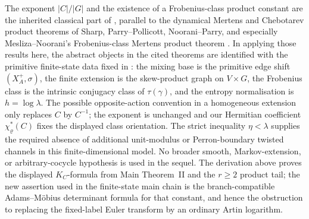 \documentclass[11pt,a4paper]{amsart}
\theoremstyle{plain}
\theoremstyle{definition}
\theoremstyle{remark}
\begin{document}
The exponent \(|C|/|G|\) and the existence of a Frobenius-class product
constant are the inherited classical part of ,
parallel to the dynamical Mertens and Chebotarev product theorems of Sharp,
Parry--Pollicott, Noorani--Parry, and especially Mesliza--Noorani's
Frobenius-class Mertens product theorem
\cite{Sharp1991Mertens,ParryPollicott1986Chebotarev,NooraniParry1992ChebotarevShifts,MeslizaNoorani1999FrobeniusMertens}.
In applying those results here, the abstract objects in the cited theorems are
identified with the primitive finite-state data fixed in
: the mixing base is the primitive edge shift
\((X_A^+,\sigma)\), the finite extension is the skew-product graph on
\(V\times G\), the Frobenius class is the intrinsic conjugacy class of
\(\tau(\gamma)\), and the entropy normalisation is \(h=\log\lambda\).  The
possible opposite-action convention in a homogeneous extension only replaces
\(C\) by \(C^{-1}\); the exponent is unchanged and our Hermitian coefficient
\(\chi_\varrho^\ast(C)\) fixes the displayed class orientation.  The
strict inequality \(\eta<\lambda\) supplies the required absence of additional
unit-modulus or Perron-boundary twisted channels in this finite-dimensional
model.  No broader smooth, Markov-extension, or arbitrary-cocycle hypothesis is
used in the sequel.
The derivation above proves the displayed \(K_C\)-formula from Main
Theorem~II and the \(r\ge2\) product tail; the new assertion used in the
finite-state main chain is the branch-compatible Adams--M\"obius determinant
formula for that constant, and hence the obstruction to replacing the
fixed-label Euler transform by an ordinary Artin logarithm.
\end{document}
